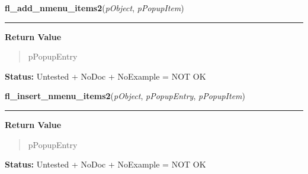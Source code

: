     \label{xformslib:library:fl_add_nmenu_items2}

    \vspace{0.5ex}

\hspace{.8\funcindent}\begin{boxedminipage}{\funcwidth}

    \raggedright \textbf{fl\_add\_nmenu\_items2}(\textit{pObject}, \textit{pPopupItem})

    \vspace{-1.5ex}

    \rule{\textwidth}{0.5\fboxrule}
\setlength{\parskip}{2ex}
\setlength{\parskip}{1ex}
      \textbf{Return Value}
    \vspace{-1ex}

      \begin{quote}
      pPopupEntry

      \end{quote}

\textbf{Status:} Untested + NoDoc + NoExample = NOT OK



    \end{boxedminipage}

    \label{xformslib:library:fl_insert_nmenu_items2}

    \vspace{0.5ex}

\hspace{.8\funcindent}\begin{boxedminipage}{\funcwidth}

    \raggedright \textbf{fl\_insert\_nmenu\_items2}(\textit{pObject}, \textit{pPopupEntry}, \textit{pPopupItem})

    \vspace{-1.5ex}

    \rule{\textwidth}{0.5\fboxrule}
\setlength{\parskip}{2ex}
\setlength{\parskip}{1ex}
      \textbf{Return Value}
    \vspace{-1ex}

      \begin{quote}
      pPopupEntry

      \end{quote}

\textbf{Status:} Untested + NoDoc + NoExample = NOT OK



    \end{boxedminipage}

